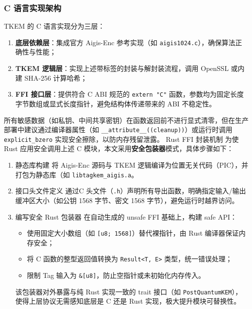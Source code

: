 \subsubsection{C 语言实现架构}
TKEM 的 C 语言实现分为三层：

\begin{enumerate}
    \item \textbf{底层依赖层}：集成官方 Aigis-Enc 参考实现（如 \texttt{aigis1024.c}），确保算法正确性与性能；
    \item \textbf{TKEM 逻辑层}：实现上述带标签的封装与解封装流程，调用 OpenSSL 或内建 SHA-256 计算哈希；
    \item \textbf{FFI 接口层}：提供符合 C ABI 规范的 \texttt{extern "C"} 函数，参数均为固定长度字节数组或显式长度指针，避免结构体传递带来的 ABI 不稳定性。
\end{enumerate}

所有敏感数据（如私钥、中间共享密钥）在函数返回前不进行显式清零，但在生产部署中建议通过编译器属性（如 \texttt{\_\_attribute\_\_((cleanup))}）或运行时调用 \texttt{explicit\_bzero} 实现安全擦除，以防内存残留泄露。
Rust FFI 封装机制
为使 Rust 应用安全调用上述 C 模块，本文采用\textbf{安全包装器}模式，具体步骤如下：
\begin{enumerate}



\item 静态库构建
将 Aigis-Enc 源码与 TKEM 逻辑编译为位置无关代码（PIC），并打包为静态库（如 \texttt{libtagkem\_aigis.a}。

\item 接口头文件定义
通过C 头文件（\texttt{.h}）声明所有导出函数，明确指定输入/输出缓冲区大小（如公钥 1568 字节、密文 1568 字节），避免运行时越界访问。


\item 编写安全 Rust 包装器
在自动生成的 unsafe FFI 基础上，构建 safe API：
\begin{itemize}
    \item 使用固定大小数组（如 \texttt{[u8; 1568]}）替代裸指针，由 Rust 编译器保证内存安全；
    \item 将 C 函数的整型返回值转换为 \texttt{Result<T, E>} 类型，统一错误处理；
    \item 限制 Tag 输入为 \texttt{\&[u8]}，防止空指针或未初始化内存传入。
\end{itemize}

该包装器对外暴露与纯 Rust 实现一致的 trait 接口（如 \texttt{PostQuantumKEM}），使得上层协议无需感知底层是 C 还是 Rust 实现，极大提升模块可替换性。

\end{enumerate}


